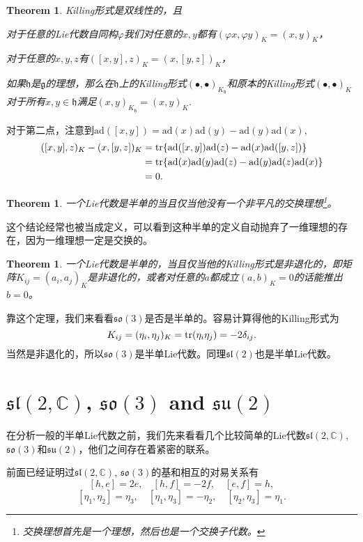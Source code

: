 \documentclass[8pt]{book}
\theoremstyle{plain}
\newtheorem{theo}[defi]{Theorem}
\newcommand{\cc}{\mathbb{C}}
\newcommand{\lag}{{\mathfrak{g}}}  %
\newcommand{\ad}{{\mathrm{ad}}}
\begin{document}
\begin{theo}
Killing形式是双线性的，且

对于任意的Lie代数自同构$\varphi$我们对任意的$x,y$都有$(\varphi x,\varphi y)_K=(x,y)_K$，

对于任意的$x,y,z$有$([x,y],z)_K=(x,[y,z])_K$，

如果$\mathfrak{h}$是$\lag$的理想，那么在$\mathfrak{h}$上的Killing形式$(\bullet,\bullet)_{K_\mathfrak{h}}$和原本的Killing形式$(\bullet,\bullet)_{K}$对于所有$x,y\in \mathfrak{h}$满足$(x,y)_{K_\mathfrak{h}}=(x,y)_K$.
\end{theo}

对于第二点，注意到$\ad([x,y])=\ad(x)\ad(y)-\ad(y)\ad(x)$,
\[
	\begin{split}
		([x,y],z)_K-(x,[y,z])_K&=\tr\{\ad([x,y])\ad(z)-\ad(x)\ad([y,z])\}\\
		&=\tr\{\ad(x)\ad(y)\ad(z)-\ad(y)\ad(z)\ad(x)\}\\
		&=0.
	\end{split}
\]

\begin{theo}
一个Lie代数是半单的当且仅当他没有一个非平凡的交换理想\footnote{交换理想首先是一个理想，然后也是一个交换子代数。}。
\end{theo}
这个结论经常也被当成定义，可以看到这种半单的定义自动抛弃了一维理想的存在，因为一维理想一定是交换的。

\begin{theo}
一个Lie代数是半单的，当且仅当他的Killing形式是非退化的，即矩阵$K_{ij}=(a_i,a_j)_K$是非退化的，或者对任意的$a$都成立$(a,b)_K=0$的话能推出$b=0$。
\end{theo}

靠这个定理，我们来看看$\mathfrak{so}(3)$是否是半单的。容易计算得他的Killing形式为
\[
	K_{ij}=(\eta_i,\eta_j)_K=\operatorname{tr}(\eta_i\eta_j)=-2\delta_{ij}.
\]
当然是非退化的，所以$\mathfrak{so}(3)$是半单Lie代数。同理$\mathfrak{sl}(2)$也是半单Lie代数。

\section{$\mathfrak{sl}(2,\cc)$, $\mathfrak{so}(3)$ and $\mathfrak{su}(2)$}
在分析一般的半单Lie代数之前，我们先来看看几个比较简单的Lie代数$\mathfrak{sl}(2,\cc)$, $\mathfrak{so}(3)$和$\mathfrak{su}(2)$，他们之间存在着紧密的联系。

前面已经证明过$\mathfrak{sl}(2,\cc)$, $\mathfrak{so}(3)$的基和相互的对易关系有
\[
[h,e]=2e,\quad[h,f]=-2f,\quad[e,f]=h,
\]
\[
	[\eta_1,\eta_2]=\eta_3,\quad [\eta_1,\eta_3]=-\eta_2,\quad [\eta_2,\eta_3]=\eta_1.
\]
\end{document}
